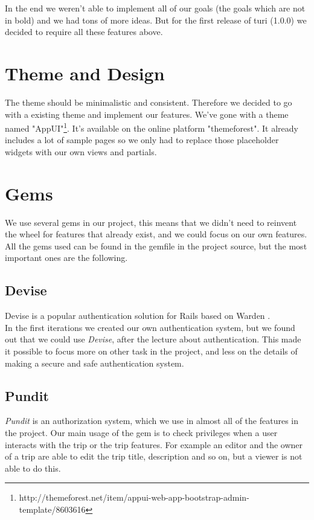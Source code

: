 \documentclass[a4paper]{article}
\begin{document}
\noindent
In the end we weren't able to implement all of our goals (the goals which are not in bold) and we had tons of more ideas. But for the first release of turi (1.0.0) we decided to require all these features above.\\

\section{Theme and Design}
The theme should be minimalistic and consistent. Therefore we decided to go with a existing theme and implement our features. We've gone with a theme named "AppUI"\footnote{http://themeforest.net/item/appui-web-app-bootstrap-admin-template/8603616}. It's available on the online platform "themeforest". It already includes a lot of sample pages so we only had to replace those placeholder widgets with our own views and partials.

\section{Gems}
We use several gems in our project, this means that we didn't need to reinvent the wheel for features that already exist, and we could focus on our own features. All the gems used can be found in the gemfile in the project source, but the most important ones are the following.
\subsection{Devise}
Devise is a popular authentication solution for Rails based on Warden \cite{devise}. \\
In the first iterations we created our own authentication system, but we found out that we could use \textit{Devise}, after the lecture about authentication. This made it possible to focus more on other task in the project, and less on the details of making a secure and safe authentication system. 

\subsection{Pundit}
\textit{Pundit} is an authorization system\cite{pundit}, which we use in almost all of the features in the project. Our main usage of the gem is to check privileges when a user interacts with the trip or the trip features. For example an editor and the owner of a trip are able to edit the trip title, description and so on, but a viewer is not able to do this. 
\end{document}
